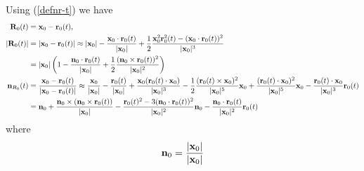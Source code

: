 Using (\ref{defnr-t}) we have
\begin{align}
    {\bf R}_0(t)     & = {\bf x}_0 -{\bf r}_0(t),                                                                                                                                                                                                                                                                                                                                                                            \\
    |{\bf R}_0(t)|   & = |{\bf x}_0-{\bf r}_0(t)| \approx |{\bf x}_0| - \frac{{\bf x}_0\cdot{\bf r}_0(t)}{|{\bf x}_0|}+\frac12\frac{{\bf x}_0^2{\bf r}_0^2(t)-({\bf x}_0\cdot{\bf r}_0(t))^2}{|{\bf x}_0|^3}
    \nonumber                                                                                                                                                                                                                                                                                                                                                                                                                \\
                     & =|{\bf x}_0| \left(1- \frac{{\bf n}_0\cdot{\bf r}_0(t)}{|{\bf x}_0|}+\frac12\frac{({\bf n}_0\times{\bf r}_0(t))^2}{|{\bf x}_0|^2}\right)     \label{expansionR_0}                                                                                                                                                                                                                                     \\
    {\bf n}_{R_0}(t) & = \frac{{\bf x}_0-{\bf r}_0(t)}{|{\bf x}_0-{\bf r}_0(t)|}\approx \frac{{\bf x}_0}{|{\bf x}_0|}-\frac{{\bf r}_0(t)}{|{\bf x}_0|}+\frac{{\bf x}_0({\bf r}_0(t)\cdot{\bf x}_0)}{|{\bf x}_0|^3}-\frac12\frac{({\bf r}_0(t)\times{\bf x}_0)^2}{|{\bf x}_0|^5}{\bf x}_0+\frac{({\bf r}_0(t)\cdot{\bf x}_0)^2}{|{\bf x}_0|^5}{\bf x}_0-\frac{{\bf r}_0(t)\cdot{\bf x}_0}{|{\bf x}_0|^3}{\bf r}_0(t)\nonumber \\
                     & = {\bf n}_0+\frac{{\bf n}_0\times({\bf n}_0\times{\bf r}_0(t))}{|{\bf x}_0|}-\frac{{\bf r}_0(t)^2-3({\bf n}_0\cdot{\bf r}_0(t))^2}{|{\bf x}_0|^2}{\bf n}_0-\frac{{\bf n}_0\cdot{\bf r}_0(t)}{|{\bf x}_0|^2}{\bf r}_0(t)
\end{align}
where
\begin{align}
    {\bf n}_0=\frac{|{\bf x}_0|}{|{\bf x}_0|}
\end{align}

